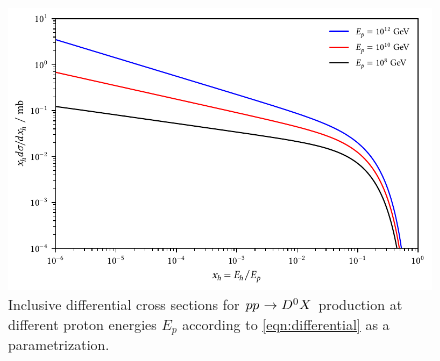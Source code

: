 \begin{figure}[H]
	\centering
	\includegraphics{../plots/build/charm_hadron_cross_section.pdf}
	\caption[Inclusive differential cross sections for $p \kern-0.1pt p \kern+0.6pt \rightarrow D^0 X \kern+0.5pt$ production.]{
			 Inclusive differential cross sections for $p \kern-0.1pt p \kern+0.6pt \rightarrow D^0 X \kern+0.5pt$ production at
			 different proton energies $E_p$ according to \eqref{eqn:differential} as a parametrization.}
	\label{fig:charm-hadron-cross-section}
\end{figure}
